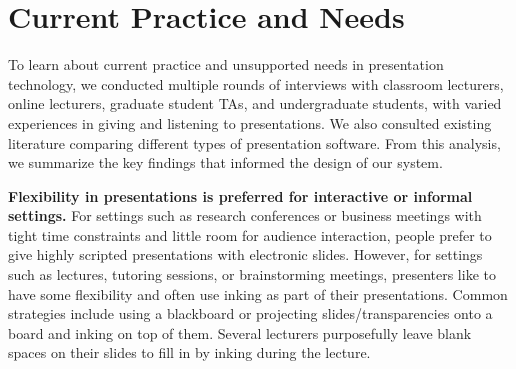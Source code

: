 \section{Current Practice and Needs}
To learn about current practice and unsupported needs in presentation technology, we conducted multiple rounds of interviews with classroom lecturers, online lecturers, graduate student TAs, and undergraduate students, with varied experiences in giving and listening to presentations. 
%
We also consulted existing literature comparing different types of presentation software.
%
From this analysis, we summarize the key findings that informed the design of our system.

\textbf{Flexibility in presentations is preferred for interactive or informal settings.} For settings such as research conferences or business meetings with tight time constraints and little room for audience interaction, people prefer to give highly scripted presentations with electronic slides. However, for settings such as lectures, tutoring sessions, or brainstorming meetings, presenters like to have some flexibility and often use inking as part of their presentations. Common strategies include using a blackboard or projecting slides/transparencies onto a board and inking on top of them. Several lecturers purposefully leave blank spaces on their slides to fill in by inking during the lecture. %

